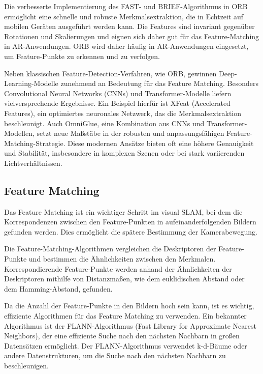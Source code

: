 Die verbesserte Implementierung des FAST- und BRIEF-Algorithmus in ORB ermöglicht eine schnelle und robuste Merkmalsextraktion, die in Echtzeit auf mobilen Geräten ausgeführt werden kann. Die Features sind invariant gegenüber Rotationen und Skalierungen und eignen sich daher gut für das Feature-Matching in AR-Anwendungen. ORB wird daher häufig in AR-Anwendungen eingesetzt, um Feature-Punkte zu erkennen und zu verfolgen. \cite{gao2021vSLAM, rublee2011orb}

Neben klassischen Feature-Detection-Verfahren, wie ORB, gewinnen Deep-Learning-Modelle zunehmend an Bedeutung für das Feature Matching. Besonders Convolutional Neural Networks (CNNs) und Transformer-Modelle liefern vielversprechende Ergebnisse. Ein Beispiel hierfür ist XFeat (Accelerated Features), ein optimiertes neuronales Netzwerk, das die Merkmalsextraktion beschleunigt. Auch OmniGlue, eine Kombination aus CNNs und Transformer-Modellen, setzt neue Maßstäbe in der robusten und anpassungsfähigen Feature-Matching-Strategie. Diese modernen Ansätze bieten oft eine höhere Genauigkeit und Stabilität, insbesondere in komplexen Szenen oder bei stark variierenden Lichtverhältnissen. \cite{ghosh2024fmNN}

\subsection{Feature Matching}

Das Feature Matching ist ein wichtiger Schritt im visual SLAM, bei dem die Korrespondenzen zwischen den Feature-Punkten in aufeinanderfolgenden Bildern gefunden werden. Dies ermöglicht die spätere Bestimmung der Kamerabewegung. \cite{gao2021vSLAM, szeliski2022computerVision}

Die Feature-Matching-Algorithmen vergleichen die Deskriptoren der Feature-Punkte und bestimmen die Ähnlichkeiten zwischen den Merkmalen. Korrespondierende Feature-Punkte werden anhand der Ähnlichkeiten der Deskriptoren mithilfe von Distanzmaßen, wie dem euklidischen Abstand oder dem Hamming-Abstand, gefunden. \cite{gao2021vSLAM, szeliski2022computerVision}

Da die Anzahl der Feature-Punkte in den Bildern hoch sein kann, ist es wichtig, effiziente Algorithmen für das Feature Matching zu verwenden. Ein bekannter Algorithmus ist der FLANN-Algorithmus (Fast Library for Approximate Nearest Neighbors), der eine effiziente Suche nach den nächsten Nachbarn in großen Datensätzen ermöglicht. Der FLANN-Algorithmus verwendet k-d-Bäume oder andere Datenstrukturen, um die Suche nach den nächsten Nachbarn zu beschleunigen. \cite{gao2021vSLAM, szeliski2022computerVision}

